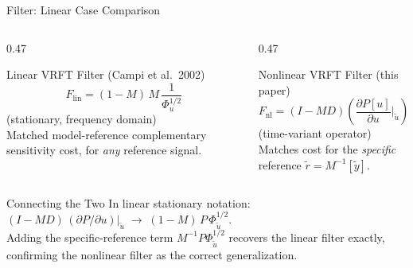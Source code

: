 \documentclass[hyperref={pdfpagemode=FullScreen},aspectratio=169]{beamer}
\begin{document}
\begin{frame}{Filter: Linear Case Comparison}
  \begin{columns}[T]
    \begin{column}{0.47\textwidth}
      \begin{block}{Linear VRFT Filter (Campi et al.\ 2002)}
        \[
          F_{\mathrm{lin}} = (1-M)\,M\,\frac{1}{\Phi_u^{1/2}}
        \]
        (stationary, frequency domain)\\[0.4em]
        Matched model-reference complementary sensitivity cost, for \emph{any} reference signal.
      \end{block}
    \end{column}
    \begin{column}{0.47\textwidth}
      \begin{block}{Nonlinear VRFT Filter (this paper)}
        \[
          F_{\mathrm{nl}} = (I-MD)\left(\frac{\partial P[u]}{\partial u}\bigg|_{\tilde{u}}\right)
        \]
        (time-variant operator)\\[0.4em]
        Matches cost for the \emph{specific} reference $\tilde{r} = M^{-1}[\tilde{y}]$.
      \end{block}
    \end{column}
  \end{columns}
  \vspace{0.5em}
  \begin{exampleblock}{Connecting the Two}
    In linear stationary notation: $(I-MD)\,(\partial P/\partial u)|_{\tilde{u}} \;\to\; (1-M)\,P\,\Phi_{\tilde{u}}^{1/2}$.\\
    Adding the specific-reference term $M^{-1}P\Phi_{\tilde{u}}^{1/2}$ recovers the linear filter exactly, confirming the nonlinear filter as the correct generalization.
  \end{exampleblock}
\end{frame}
\end{document}
